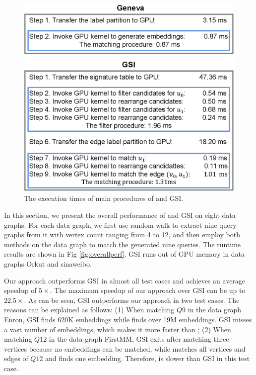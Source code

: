 \begin{figure}
\centering
\includegraphics[width=\columnwidth]{./figure/comparegsi.eps}
\caption{The execution times of main procedures of \SystemName and GSI.}	
\label{fig:compdvgsi}
\end{figure}
In this section, we present the overall performance of \SystemName and GSI on eight data graphs. For each data graph, we first use random
walk to extract nine query graphs from it with vertex count ranging from 4 to 12, and then employ both methods on the data graph to match
the generated nine queries. The runtime results are shown in Fig \ref{fig:overallperf}. GSI runs out of GPU memory in data graphs Orkut and
sinaweibo.

Our approach outperforms GSI in almost all test cases and achieves an average speedup of $5\times$. The maximum speedup of our approach
over GSI can be up to $22.5\times$. As can be seen, GSI outperforms our approach in two test cases. The reasons can be explained as
follows: (1) When matching $Q9$ in the data graph Enron, GSI finds 620K embeddings while \SystemName finds over 19M embeddings. GSI misses
a vast number of embeddings, which makes it more faster than \SystemName; (2) When matching $Q12$ in the data graph FirstMM, GSI exits
after matching three vertices because no embeddings can be matched, while \SystemName matches all vertices and edges of $Q12$ and finds one
embedding. Therefore, \SystemName is slower than GSI in this test case.

